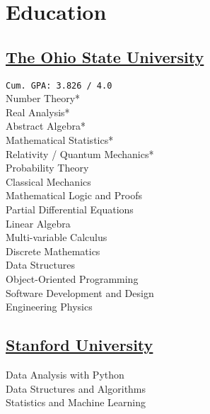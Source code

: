 \documentclass[]{deedy-resume-openfont}
\begin{document}
%
%
%
%

%
%

\begin{minipage}[t]{0.25\textwidth} 

\section{Education} 

\subsection{\href{https://www.osu.edu/}{The Ohio State University}}
\texttt{Cum. GPA: 3.826 / 4.0} \\
Number Theory* \\
Real Analysis* \\
Abstract Algebra* \\
Mathematical Statistics* \\
Relativity / Quantum Mechanics* \\
Probability Theory \\
Classical Mechanics \\
Mathematical Logic and Proofs \\
Partial Differential Equations \\
Linear Algebra\\
Multi-variable Calculus\\
Discrete Mathematics\\
Data Structures \\
Object-Oriented Programming\\
Software Development and Design\\
Engineering Physics\\

\sectionsep
\subsection{\href{https://stanford.edu/}{Stanford University}}
Data Analysis with Python \\ 
Data Structures and Algorithms\\
Statistics and Machine Learning \\
\sectionsep


\end{minipage}
\end{document}
